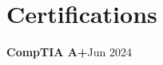 \section{Certifications}
    \resumeSubHeadingListStart
    
      \resumeProjectHeading
          {\textbf{CompTIA A+}}{Jun 2024}
          
    \resumeSubHeadingListEnd